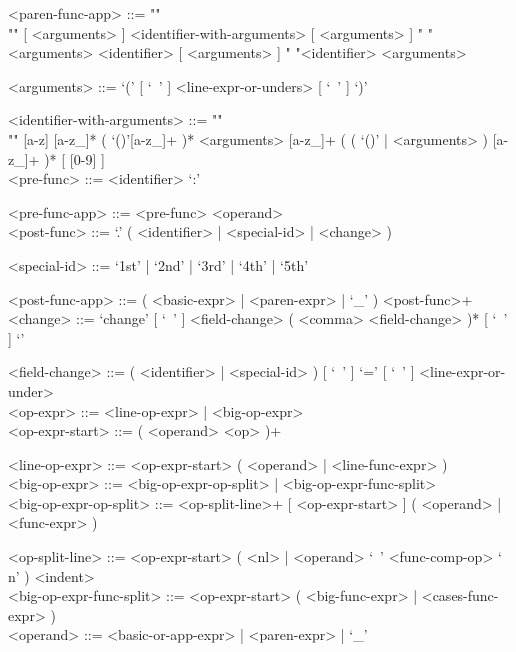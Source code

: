 \documentclass{article}
\begin{document}
\begin{grammar}
<paren-func-app> ::= ""\\""
[ <arguments> ] <identifier-with-arguments> [ <arguments> ]
\alt " "<arguments> <identifier> [ <arguments> ]
\alt " "<identifier> <arguments>

<arguments> ::= `(' [ `\ ' ] <line-expr-or-unders> [ `\ ' ] `)'

<identifier-with-arguments> ::= ""\\""
[a-z] [a-z_]* ( `()'[a-z_]+ )* <arguments>
[a-z_]+ ( ( `()' | <arguments> ) [a-z_]+ )* 
[ [0-9] ]
\\

\newpage
<pre-func> ::= <identifier> `:'

<pre-func-app> ::= <pre-func> <operand>
\\

<post-func> ::= `.' ( <identifier> | <special-id> | <change> )

<special-id> ::= `1st' | `2nd' | `3rd' | `4th' | `5th'

<post-func-app> ::= ( <basic-expr> | <paren-expr> | `_' ) <post-func>+
\\

<change> ::=
`change{' [ `\ ' ] <field-change> ( <comma> <field-change> )* [ `\ ' ] `}'

<field-change> ::=
( <identifier> | <special-id> ) [ `\ ' ] `=' [ `\ ' ] <line-expr-or-under>
\\

<op-expr> ::= <line-op-expr> | <big-op-expr>
\\

<op-expr-start> ::= ( <operand> <op> )+

<line-op-expr> ::= <op-expr-start> ( <operand> | <line-func-expr> )
\\

<big-op-expr> ::= 
<big-op-expr-op-split> | <big-op-expr-func-split>
\\

<big-op-expr-op-split> ::= 
<op-split-line>+ [ <op-expr-start> ] ( <operand> | <func-expr> )

<op-split-line> ::=
<op-expr-start> ( <nl> | <operand> `\ ' <func-comp-op> `\\n' ) <indent> 
\\

<big-op-expr-func-split> ::=
<op-expr-start> ( <big-func-expr> | <cases-func-expr> )
\\

<operand> ::= <basic-or-app-expr> | <paren-expr> | `_'
\\


\end{grammar}
\end{document}
